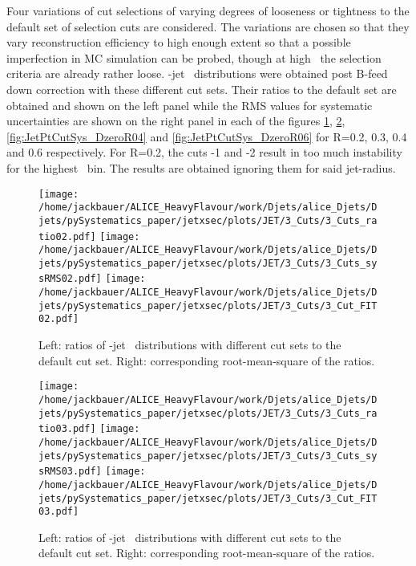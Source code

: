 Four variations of cut selections of varying degrees of looseness or tightness to the default set of selection cuts are considered. The variations are chosen so that they vary \Dzero reconstruction efficiency to high enough extent so that a possible imperfection in MC simulation can be probed, though at high \ptd\ the selection criteria are already rather loose.
\Dzero-jet \pt\ distributions were obtained post B-feed down correction with these different cut sets. Their ratios to the default set are obtained and shown on the left panel while the RMS values for systematic uncertainties are shown on the right panel in each of the figures \ref{fig:JetPtCutSys_DzeroR02}, \ref{fig:JetPtCutSys_DzeroR03}, \ref{fig:JetPtCutSys_DzeroR04} and \ref{fig:JetPtCutSys_DzeroR06} for R=0.2, 0.3, 0.4 and 0.6 respectively. For R=0.2, the cuts -1 and -2 result in too much instability for the highest \pt\ bin. The results are obtained ignoring them for said jet-radius.


\begin{figure}[bth]
\begin{center}
\texttt{[image: /home/jackbauer/ALICE\_HeavyFlavour/work/Djets/alice\_Djets/Djets/pySystematics\_paper/jetxsec/plots/JET/3\_Cuts/3\_Cuts\_ratio02.pdf]}
\texttt{[image: /home/jackbauer/ALICE\_HeavyFlavour/work/Djets/alice\_Djets/Djets/pySystematics\_paper/jetxsec/plots/JET/3\_Cuts/3\_Cuts\_sysRMS02.pdf]}
\texttt{[image: /home/jackbauer/ALICE\_HeavyFlavour/work/Djets/alice\_Djets/Djets/pySystematics\_paper/jetxsec/plots/JET/3\_Cuts/3\_Cut\_FIT02.pdf]}
\caption{Left: ratios of \Dzero-jet \pt\ distributions with different cut sets to the default cut set. Right: corresponding root-mean-square of the ratios.} 
\label{fig:JetPtCutSys_DzeroR02}
\end{center}
\end{figure}

\begin{figure}[bth]
\begin{center}
\texttt{[image: /home/jackbauer/ALICE\_HeavyFlavour/work/Djets/alice\_Djets/Djets/pySystematics\_paper/jetxsec/plots/JET/3\_Cuts/3\_Cuts\_ratio03.pdf]}
\texttt{[image: /home/jackbauer/ALICE\_HeavyFlavour/work/Djets/alice\_Djets/Djets/pySystematics\_paper/jetxsec/plots/JET/3\_Cuts/3\_Cuts\_sysRMS03.pdf]}
\texttt{[image: /home/jackbauer/ALICE\_HeavyFlavour/work/Djets/alice\_Djets/Djets/pySystematics\_paper/jetxsec/plots/JET/3\_Cuts/3\_Cut\_FIT03.pdf]}
\caption{Left: ratios of \Dzero-jet \pt\ distributions with different cut sets to the default cut set. Right: corresponding root-mean-square of the ratios.} 
\label{fig:JetPtCutSys_DzeroR03}
\end{center}
\end{figure}


